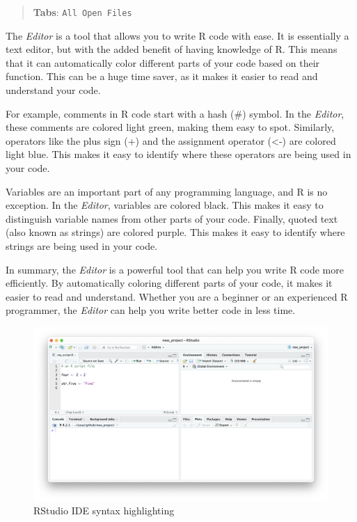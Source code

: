 \documentclass[
]{book}
\begin{document}
\begin{quote}
\textbf{Tabs}: \texttt{All\ Open\ Files}
\end{quote}

The \emph{Editor} is a tool that allows you to write R code with ease. It is essentially a text editor, but with the added benefit of having knowledge of R. This means that it can automatically color different parts of your code based on their function. This can be a huge time saver, as it makes it easier to read and understand your code.

For example, comments in R code start with a hash (\#) symbol. In the \emph{Editor}, these comments are colored light green, making them easy to spot. Similarly, operators like the plus sign (+) and the assignment operator (\textless-) are colored light blue. This makes it easy to identify where these operators are being used in your code.

Variables are an important part of any programming language, and R is no exception. In the \emph{Editor}, variables are colored black. This makes it easy to distinguish variable names from other parts of your code. Finally, quoted text (also known as strings) are colored purple. This makes it easy to identify where strings are being used in your code.

In summary, the \emph{Editor} is a powerful tool that can help you write R code more efficiently. By automatically coloring different parts of your code, it makes it easier to read and understand. Whether you are a beginner or an experienced R programmer, the \emph{Editor} can help you write better code in less time.

\begin{figure}
\includegraphics[width=31.94in]{images/02_022_editor_highlighting} \caption{\label{fig:2022}RStudio IDE syntax highlighting}\label{fig:2022}
\end{figure}
\end{document}
